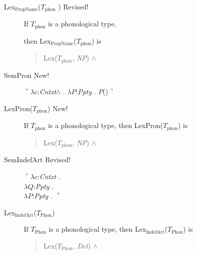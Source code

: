 \begin{description}
\item[\textnormal{Lex$_{\mathrm{PropName}}$($T_{\mathrm{phon}}$
    )} Revised!] \mbox{}

  If $T_{\mathrm{phon}}$ is a phonological type,

  then Lex$_{\mathrm{PropName}}$($T_{\mathrm{phon}}$) is
  \begin{quote}
    Lex($T_{\mathrm{phon}}$, \textit{NP}) \d{$\wedge$}
\end{quote}

\item[\textnormal{SemPron} New!] \mbox{}

$\ulcorner\lambda c$:\textit{Cntxt}\d{$\wedge$} . $\lambda
  P$:\textit{Ppty}
  . $P$()$\urcorner$

\item[\textnormal{LexPron($T_{\text{phon}}$)} New!] \mbox{}

If $T_{\text{phon}}$ is a phonological type, then
LexPron($T_{\text{phon}}$) is
\begin{quote}
Lex($T_{\mathrm{phon}}$, \textit{NP}) \d{$\wedge$}
\end{quote}

  
\item[\textnormal{SemIndefArt} Revised!] \mbox{}

  $\ulcorner\lambda c$:\textit{Cntxt} . \\
\hspace*{1em}$\lambda Q$:\textit{Ppty} . \\
\hspace*{2em} $\lambda P$:\textit{Ppty}
. $\urcorner$

        
      \item[\textnormal{Lex$_{\mathrm{IndefArt}}$($T_{\mathrm{Phon}}$)}]
        \mbox{}

        If $T_{\mathrm{Phon}}$ is a phonological type, then
        Lex$_{\mathrm{IndefArt}}$($T_{\mathrm{Phon}}$) is
        \begin{quote}
          Lex($T_{\mathrm{Phon}}$, \textit{Det}) \d{$\wedge$}
        \end{quote}
        

\end{description}
